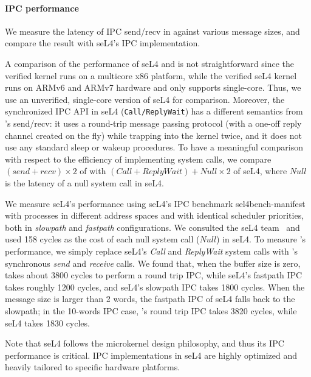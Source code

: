 \vspace*{-10pt}
\paragraph{IPC performance} We measure the latency of IPC send/recv in {\mCTOS}
against various message sizes, and compare the result with seL4's IPC
implementation.

A comparison of the performance of seL4 and \mCTOS{} is not
straightforward since the verified \mCTOS{} kernel runs on a multicore
x86 platform, while the verified seL4 kernel runs on ARMv6 and ARMv7
hardware and only supports single-core. Thus, we use an unverified,
single-core version of seL4 for comparison. Moreover, the synchronized
IPC API in seL4 (\texttt{Call/ReplyWait}) has a different semantics
from \mCTOS{}'s send/recv: it uses a round-trip message passing
protocol (with a one-off reply channel created on the fly) while
trapping into the kernel twice, and it does not use any standard sleep
or wakeup procedures. To have a meaningful comparison with respect
to the efficiency of implementing system calls, we compare
$(send + recv) \times 2$
of \mCTOS{} with
${(Call + ReplyWait) + Null \times 2}$ of seL4,
where $Null$ is the latency of a null system call in seL4.

We measure seL4's performance using seL4's IPC benchmark
sel4bench-manifest~\cite{sel4bench} with processes in different
address spaces and with identical scheduler priorities, both in
\emph{slowpath} and \emph{fastpath} configurations. We consulted the
seL4 team~\cite{heiser16} and used 158 cycles as the cost of each null
system call ($Null$) in seL4. To measure \mCTOS{}'s performance, we
simply replace seL4's \emph{Call} and \emph{ReplyWait} system calls
with {\mCTOS}'s synchronous \emph{send} and \emph{receive} calls. We
found that, when the buffer size is zero, \mCTOS{} takes about 3800
cycles to perform a round trip IPC, while seL4's fastpath IPC takes
roughly 1200 cycles, and seL4's slowpath IPC takes 1800 cycles. When
the message size is larger than 2 words, the fastpath IPC of seL4
falls back to the slowpath; in the 10-words IPC case, \mCTOS{}'s round
trip IPC takes 3820 cycles, while seL4 takes 1830 cycles.
Note that seL4 follows the microkernel design philosophy, and thus its
IPC performance is critical. IPC implementations in seL4 are highly
optimized and heavily tailored to specific hardware platforms.

